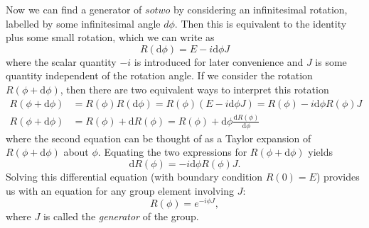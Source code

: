 \begin{example}
    Now we can find a generator of $sotwo$ by considering an infinitesimal rotation, labelled by some infinitesimal angle $d\phi$. Then this is equivalent to the identity plus some small rotation, which we can write as
    \begin{equation}
        R(\textrm{d}\phi) = E - i \textrm{d}\phi J
    \end{equation}
    where the scalar quantity $-i$ is introduced for later convenience and $J$ is some quantity independent of the rotation angle. If we consider the rotation $R(\phi + \textrm{d}\phi)$, then there are two equivalent ways to interpret this rotation
    \begin{align}
        R(\phi + \textrm{d}\phi) &= R(\phi)R(\textrm{d}\phi) = R(\phi)(E - i \textrm{d}\phi J) = R(\phi) - i \textrm{d}\phi R(\phi)J \\
        R(\phi + \textrm{d}\phi) &= R(\phi) + \textrm{d}R(\phi) = R(\phi) + \textrm{d}\phi\frac{\textrm{d}R(\phi)}{\textrm{d}\phi}
    \end{align}
    where the second equation can be thought of as a Taylor expansion of $R(\phi + \textrm{d}\phi)$ about $\phi$. Equating the two expressions for $R(\phi + \textrm{d}\phi)$ yields
    \begin{equation}
        \textrm{d}R(\phi) = -i\textrm{d}\phi R(\phi)J.
    \end{equation}
    Solving this differential equation (with boundary condition $R(0)=E$) provides us with an equation for any group element involving $J$:
    \begin{equation}
        R(\phi) = e^{-i\phi J},
    \end{equation}
    where $J$ is called the \textit{generator} of the group.
\end{example}